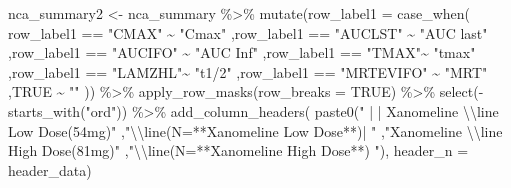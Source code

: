 \documentclass[
  letterpaper,
  DIV=11,
  numbers=noendperiod]{scrreprt}
\newenvironment{Shaded}{\begin{snugshade}}{\end{snugshade}}
\newcommand{\AttributeTok}[1]{\textcolor[rgb]{0.40,0.45,0.13}{#1}}
\newcommand{\ConstantTok}[1]{\textcolor[rgb]{0.56,0.35,0.01}{#1}}
\newcommand{\FunctionTok}[1]{\textcolor[rgb]{0.28,0.35,0.67}{#1}}
\newcommand{\NormalTok}[1]{\textcolor[rgb]{0.00,0.23,0.31}{#1}}
\newcommand{\OtherTok}[1]{\textcolor[rgb]{0.00,0.23,0.31}{#1}}
\newcommand{\SpecialCharTok}[1]{\textcolor[rgb]{0.37,0.37,0.37}{#1}}
\newcommand{\StringTok}[1]{\textcolor[rgb]{0.13,0.47,0.30}{#1}}
\begin{document}
\begin{Shaded}
\begin{Highlighting}[]
\NormalTok{nca\_summary2 }\OtherTok{\textless{}{-}}\NormalTok{ nca\_summary }\SpecialCharTok{\%\textgreater{}\%}
    \FunctionTok{mutate}\NormalTok{(}\AttributeTok{row\_label1 =} \FunctionTok{case\_when}\NormalTok{(}
\NormalTok{      row\_label1 }\SpecialCharTok{==} \StringTok{"CMAX"} \SpecialCharTok{\textasciitilde{}} \StringTok{"Cmax"}
\NormalTok{     ,row\_label1 }\SpecialCharTok{==} \StringTok{"AUCLST"} \SpecialCharTok{\textasciitilde{}} \StringTok{"AUC last"}
\NormalTok{     ,row\_label1 }\SpecialCharTok{==} \StringTok{"AUCIFO"} \SpecialCharTok{\textasciitilde{}} \StringTok{"AUC Inf"}
\NormalTok{     ,row\_label1 }\SpecialCharTok{==} \StringTok{"TMAX"}\SpecialCharTok{\textasciitilde{}} \StringTok{"tmax"}
\NormalTok{     ,row\_label1 }\SpecialCharTok{==} \StringTok{"LAMZHL"}\SpecialCharTok{\textasciitilde{}} \StringTok{"t1/2"}
\NormalTok{     ,row\_label1 }\SpecialCharTok{==} \StringTok{"MRTEVIFO"} \SpecialCharTok{\textasciitilde{}} \StringTok{"MRT"}
\NormalTok{     ,}\ConstantTok{TRUE} \SpecialCharTok{\textasciitilde{}} \StringTok{""}
\NormalTok{    )) }\SpecialCharTok{\%\textgreater{}\%}
    \FunctionTok{apply\_row\_masks}\NormalTok{(}\AttributeTok{row\_breaks =} \ConstantTok{TRUE}\NormalTok{) }\SpecialCharTok{\%\textgreater{}\%}   
    \FunctionTok{select}\NormalTok{(}\SpecialCharTok{{-}}\FunctionTok{starts\_with}\NormalTok{(}\StringTok{"ord"}\NormalTok{)) }\SpecialCharTok{\%\textgreater{}\%} 
    \FunctionTok{add\_column\_headers}\NormalTok{(}
      \FunctionTok{paste0}\NormalTok{(}\StringTok{" | | Xanomeline }\SpecialCharTok{\textbackslash{}\textbackslash{}}\StringTok{line Low Dose(54mg)"}
\NormalTok{             ,}\StringTok{"}\SpecialCharTok{\textbackslash{}\textbackslash{}}\StringTok{line(N=**Xanomeline Low Dose**)| "}
\NormalTok{             ,}\StringTok{"Xanomeline }\SpecialCharTok{\textbackslash{}\textbackslash{}}\StringTok{line High Dose(81mg)"}
\NormalTok{             ,}\StringTok{"}\SpecialCharTok{\textbackslash{}\textbackslash{}}\StringTok{line(N=**Xanomeline High Dose**) "}\NormalTok{), }
      \AttributeTok{header\_n =}\NormalTok{ header\_data) }


\end{Highlighting}
\end{Shaded}
\end{document}
